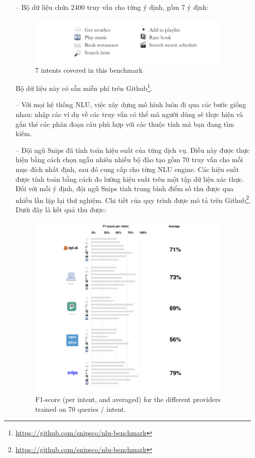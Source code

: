 \begin{itemize}
	\item[--]Bộ dữ liệu chứa 2400 truy vấn cho từng ý định, gồm 7 ý định:
	
		\begin{figure}[htp]
    \centering
    \includegraphics[width=10cm]{images/ComparisonOfNLU/7ntents.png}
    \caption{7 intents covered in this benchmark}
    \label{fig:system-class-intent}
\end{figure}
	Bộ dữ liệu này có sẵn miễn phí trên Github\footnote{\url{https://github.com/snipsco/nlu-benchmark}}.
	\item[--]Với mọi hệ thống NLU, việc xây dựng mô hình luôn đi qua các bước giống nhau: nhập các ví dụ về các truy vấn có thể mà người dùng sẽ thực hiện và gắn thẻ các phân đoạn câu phù hợp với các thuộc tính mà bạn đang tìm kiếm.
	
	\item[--]Đội ngũ Snips đã tính toán hiệu suất của từng dịch vụ. Điều này được thực hiện bằng cách chọn ngẫu nhiên nhiều bộ đào tạo gồm 70 truy vấn cho mỗi mục đích nhất định, sau đó cung cấp cho từng NLU engine. Các hiệu suất được tính toán bằng cách đo lường hiệu suất trên một tập dữ liệu xác thực. Đối với mỗi ý định, đội ngũ Snips tính trung bình điểm số thu được qua nhiều lần lặp lại thử nghiệm. Chi tiết của quy trình được mô tả trên Github\footnote{\url{https://github.com/snipsco/nlu-benchmark}}. Dưới đây là kết quả thu được:

		\begin{figure}[htp]
    \centering
    \includegraphics[width=10cm]{images/ComparisonOfNLU/f1Score70Intents.png}
    \caption{F1-score (per intent, and averaged) for the different providers trained on 70 queries / intent.}
    \label{fig:system-class-intent}
		\end{figure}
	

\end{itemize}
